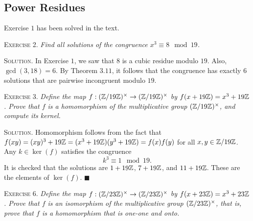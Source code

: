 \documentclass[11pt, leqno]{article}
\newcommand{\done}{\ensuremath{\blacksquare}}
\begin{document}
\subsection{Power Residues}

%


Exercise $1$ has been solved in the text.

\textsc{Exercise 2}. \emph{Find all solutions of the congruence $x^3\equiv 8 \mod 19$.}

\textsc{Solution}. In Exercise $1$, we saw that $8$ is a cubic residue modulo $19$. Also, $\gcd(3,18) = 6$. By Theorem $3.11$, it follows that the congruence has exactly $6$ solutions that are pairwise incongruent modulo $19$.

\textsc{Exercise 3}. \emph{Define the map $f:(\mathbb{Z}/19\mathbb{Z})^{\times} \to (\mathbb{Z}/19\mathbb{Z})^{\times}$ by $f(x+19\mathbb{Z}) = x^3+19\mathbb{Z}$. Prove that $f$ is a homomorphism of the multiplicative group $(\mathbb{Z}/19\mathbb{Z})^{\times}$, and compute its kernel.}

\textsc{Solution}. Homomorphism follows from the fact that $f(xy) = (xy)^3 + 19\mathbb{Z} = (x^3+19\mathbb{Z})(y^3+19\mathbb{Z}) = f(x)f(y)$ for all $x,y \in \mathbb{Z}/19\mathbb{Z}$. Any $k\in \ker(f)$ satisfies the congruence
\begin{displaymath}
k^3 \equiv 1 \mod 19.
\end{displaymath}
It is checked that the solutions are $1+19\mathbb{Z}$, $7+19\mathbb{Z}$, and $11+19\mathbb{Z}$. These are the elements of $\ker(f)$. \done

\textsc{Exercise 6}. \emph{Define the map $f: (\mathbb{Z}/23\mathbb{Z})^{\times} \to (\mathbb{Z}/23\mathbb{Z})^{\times}$ by $f(x+ 23\mathbb{Z}) = x^3 + 23\mathbb{Z}$. Prove that $f$ is an isomorphism of the multiplicative group $(\mathbb{Z}/23\mathbb{Z})^{\times}$, that is, prove that $f$ is a homomorphism that is one-one and onto.}
\end{document}
